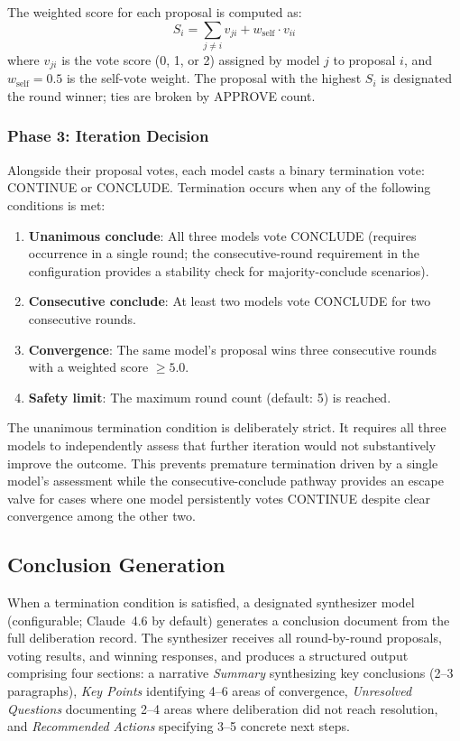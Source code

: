 \documentclass[11pt,a4paper]{article}
\begin{document}
The weighted score for each proposal is computed as:
\begin{equation}
    S_i = \sum_{j \neq i} v_{ji} + w_{\text{self}} \cdot v_{ii}
    \label{eq:score}
\end{equation}
where $v_{ji}$ is the vote score (0, 1, or 2) assigned by model $j$ to proposal $i$, and $w_{\text{self}} = 0.5$ is the self-vote weight. The proposal with the highest $S_i$ is designated the round winner; ties are broken by APPROVE count.

\subsubsection{Phase 3: Iteration Decision}

Alongside their proposal votes, each model casts a binary termination vote: CONTINUE or CONCLUDE. Termination occurs when any of the following conditions is met:

\begin{enumerate}[nosep]
    \item \textbf{Unanimous conclude}: All three models vote CONCLUDE (requires occurrence in a single round; the consecutive-round requirement in the configuration provides a stability check for majority-conclude scenarios).
    \item \textbf{Consecutive conclude}: At least two models vote CONCLUDE for two consecutive rounds.
    \item \textbf{Convergence}: The same model's proposal wins three consecutive rounds with a weighted score $\geq 5.0$.
    \item \textbf{Safety limit}: The maximum round count (default: 5) is reached.
\end{enumerate}

The unanimous termination condition is deliberately strict. It requires all three models to independently assess that further iteration would not substantively improve the outcome. This prevents premature termination driven by a single model's assessment while the consecutive-conclude pathway provides an escape valve for cases where one model persistently votes CONTINUE despite clear convergence among the other two.

\subsection{Conclusion Generation}
\label{sec:conclusion_generation}

When a termination condition is satisfied, a designated synthesizer model (configurable; Claude~4.6 by default) generates a conclusion document from the full deliberation record. The synthesizer receives all round-by-round proposals, voting results, and winning responses, and produces a structured output comprising four sections: a narrative \emph{Summary} synthesizing key conclusions (2--3 paragraphs), \emph{Key Points} identifying 4--6 areas of convergence, \emph{Unresolved Questions} documenting 2--4 areas where deliberation did not reach resolution, and \emph{Recommended Actions} specifying 3--5 concrete next steps.
\end{document}
